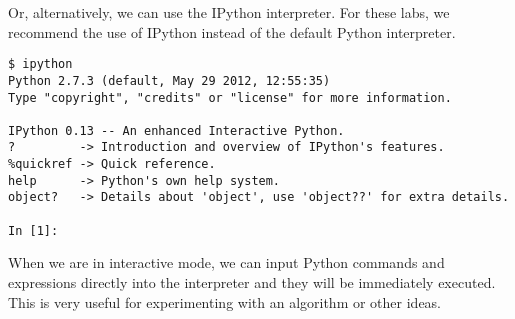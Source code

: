 Or, alternatively, we can use the IPython interpreter.  For these labs, we recommend the use of IPython instead of the default Python interpreter.
\begin{lstlisting}
$ ipython
Python 2.7.3 (default, May 29 2012, 12:55:35) 
Type "copyright", "credits" or "license" for more information.

IPython 0.13 -- An enhanced Interactive Python.
?         -> Introduction and overview of IPython's features.
%quickref -> Quick reference.
help      -> Python's own help system.
object?   -> Details about 'object', use 'object??' for extra details.

In [1]: 
\end{lstlisting}

When we are in interactive mode, we can input Python commands and expressions directly into the interpreter and they will be immediately executed.  This is very useful for experimenting with an algorithm or other ideas.
